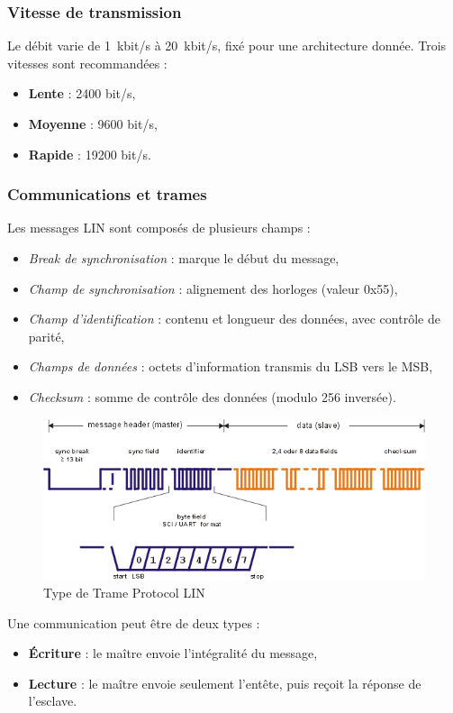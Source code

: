 \subsubsection*{Vitesse de transmission}  
Le débit varie de \SI{1}{kbit/s} à \SI{20}{kbit/s}, fixé pour une architecture donnée. Trois vitesses sont recommandées :  
\begin{itemize}
    \item \textbf{Lente} : 2400 bit/s,  
    \item \textbf{Moyenne} : 9600 bit/s,  
    \item \textbf{Rapide} : 19200 bit/s.  
\end{itemize}

\subsubsection*{Communications et trames}  
Les messages LIN sont composés de plusieurs champs :  
\begin{itemize}
    \item \textit{Break de synchronisation} : marque le début du message,  
    \item \textit{Champ de synchronisation} : alignement des horloges (valeur 0x55),  
    \item \textit{Champ d’identification} : contenu et longueur des données, avec contrôle de parité,  
    \item \textit{Champs de données} : octets d’information transmis du LSB vers le MSB,  
    \item \textit{Checksum} : somme de contrôle des données (modulo 256 inversée).  
\end{itemize}

\begin{figure}[H]
    \centering
    \includegraphics[width=0.8\linewidth]{images//Intro/Trame_LIN.png}
    \caption{Type de Trame Protocol LIN}
    \label{fig:placeholder}
\end{figure}

Une communication peut être de deux types :  
\begin{itemize}
    \item \textbf{Écriture} : le maître envoie l’intégralité du message,  
    \item \textbf{Lecture} : le maître envoie seulement l’entête, puis reçoit la réponse de l’esclave.  
\end{itemize}


